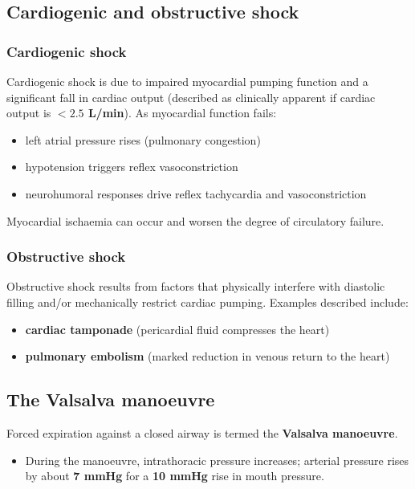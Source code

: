 \documentclass[11pt,a4paper]{article}
\begin{document}
\subsection{Cardiogenic and obstructive shock}

\subsubsection{Cardiogenic shock}
Cardiogenic shock is due to impaired myocardial pumping function and a significant fall in cardiac output (described as clinically apparent if cardiac output is \textbf{$<2.5$ L/min}). As myocardial function fails:
\begin{itemize}
\item left atrial pressure rises (pulmonary congestion)
\item hypotension triggers reflex vasoconstriction
\item neurohumoral responses drive reflex tachycardia and vasoconstriction
\end{itemize}
Myocardial ischaemia can occur and worsen the degree of circulatory failure.

\subsubsection{Obstructive shock}
Obstructive shock results from factors that physically interfere with diastolic filling and/or mechanically restrict cardiac pumping. Examples described include:
\begin{itemize}
\item \textbf{cardiac tamponade} (pericardial fluid compresses the heart)
\item \textbf{pulmonary embolism} (marked reduction in venous return to the heart)
\end{itemize}

\subsection{The Valsalva manoeuvre}
Forced expiration against a closed airway is termed the \textbf{Valsalva manoeuvre}.
\begin{itemize}
\item During the manoeuvre, intrathoracic pressure increases; arterial pressure rises by about \textbf{7 mmHg} for a \textbf{10 mmHg} rise in mouth pressure.
\end{itemize}
\end{document}
